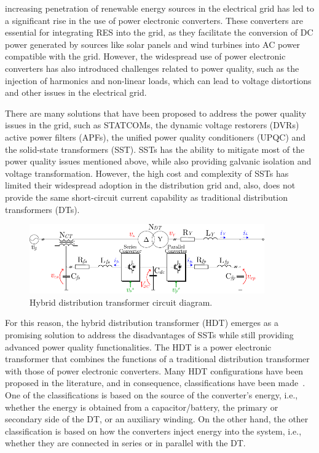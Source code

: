  increasing penetration of renewable energy sources in the electrical grid has led to a significant rise in the use of power electronic converters. These converters are essential for integrating RES into the grid, as they facilitate the conversion of DC power generated by sources like solar panels and wind turbines into AC power compatible with the grid. However, the widespread use of power electronic converters has also introduced challenges related to power quality, such as the injection of harmonics and non-linear loads, which can lead to voltage distortions and other issues in the electrical grid.

There are many solutions that have been proposed to address the power quality issues in the grid, such as STATCOMs, the dynamic voltage restorers (DVRs) active power filters (APFs), the unified power quality conditioners (UPQC) and the solid-state transformers (SST). SSTs has the ability to mitigate most of the power quality issues mentioned above, while also providing galvanic isolation and voltage transformation. However, the high cost and complexity of SSTs has limited their widespread adoption in the distribution grid and, also, does not provide the same short-circuit current capability as traditional distribution transformers (DTs).

\begin{figure}[t!]
    \centering
    \includegraphics[width=0.9\textwidth]{Images/HDT_Diagram.pdf} 
    \caption{Hybrid distribution transformer circuit diagram.}
    \label{fig:HDT_Transformer}
\end{figure}

For this reason, the hybrid distribution transformer (HDT) emerges as a promising solution to address the disadvantages of SSTs while still providing advanced power quality functionalities.
The HDT is a power electronic transformer that combines the functions of a traditional distribution transformer with those of power electronic converters. Many HDT configurations have been proposed in the literature, and in consequence, classifications have been made~\cite{carrenoConfigurationsPowerTopologies2021}. One of the classifications is based on the source of the converter's energy, i.e., whether the energy is obtained from a capacitor/battery, the primary or secondary side of the DT, or an auxiliary winding. On the other hand, the other classification is based on how the converters inject energy into the system, i.e., whether they are connected in series or in parallel with the DT. 

